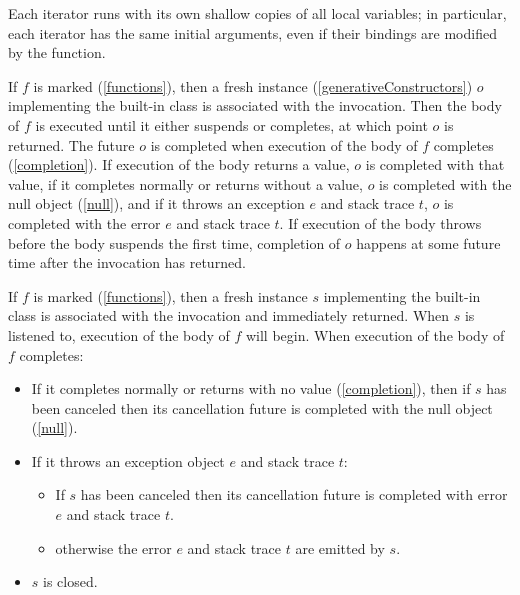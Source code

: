 \documentclass{article}
\begin{document}
\LMHash{}
Each iterator runs with its own shallow copies of all local variables; in particular, each iterator has the same initial arguments, even if their bindings are modified by the function.

\LMHash{}
If $f$ is marked \ASYNC{} (\ref{functions}), then a fresh instance (\ref{generativeConstructors}) $o$ implementing the built-in class  is associated with the invocation.
Then the body of $f$ is executed until it either suspends or completes, at which point $o$ is returned.
The future $o$ is completed when execution of the body of $f$ completes (\ref{completion}).
If execution of the body returns a value, $o$ is completed with that value,
if it completes normally or returns without a value,
$o$ is completed with the null object (\ref{null}),
and if it throws an exception $e$ and stack trace $t$,
$o$ is completed with the error $e$ and stack trace $t$.
If execution of the body throws before the body suspends the first time,
completion of $o$ happens at some future time after the invocation has returned.

\LMHash{}
If $f$ is marked \ASYNC* (\ref{functions}), then a fresh instance $s$ implementing the built-in class  is associated with the invocation and immediately returned.
When $s$ is listened to, execution of the body of $f$ will begin.
When execution of the body of $f$ completes:
\begin{itemize}
\item If it completes normally or returns with no value (\ref{completion}), then if $s$ has been canceled then its cancellation future is completed with the null object (\ref{null}).
\item If it throws an exception object $e$ and stack trace $t$:
  \begin{itemize}
  \item If $s$ has been canceled then its cancellation future is completed with error $e$ and stack trace $t$.
  \item otherwise the error $e$ and stack trace $t$ are emitted by $s$.
  \end{itemize}
\item $s$ is closed.
\end{itemize}
\end{document}
